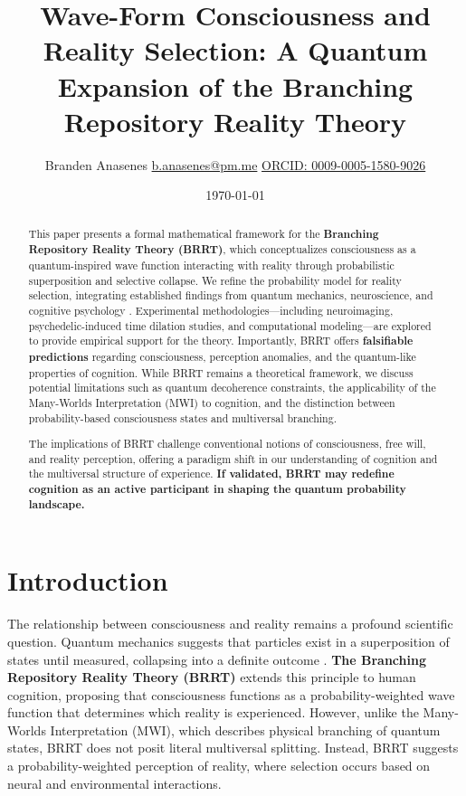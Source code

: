 \documentclass{article}
\title{Wave-Form Consciousness and Reality Selection: A Quantum Expansion of the Branching Repository Reality Theory}
\author{Branden Anasenes \href{mailto:b.anasenes@pm.me}{b.anasenes@pm.me} \href{https://orcid.org/0009-0005-1580-9026}{ORCID: 0009-0005-1580-9026}}
\date{\today}
\begin{document}
\maketitle

\begin{abstract}
This paper presents a formal mathematical framework for the \textbf{Branching Repository Reality Theory (BRRT)}, which conceptualizes consciousness as a quantum-inspired wave function interacting with reality through probabilistic superposition and selective collapse. We refine the probability model for reality selection, integrating established findings from quantum mechanics, neuroscience, and cognitive psychology \cite{schrodinger1935present, fisher2015quantum, carhart2012neural}. Experimental methodologies—including neuroimaging, psychedelic-induced time dilation studies, and computational modeling—are explored to provide empirical support for the theory. Importantly, BRRT offers \textbf{falsifiable predictions} regarding consciousness, perception anomalies, and the quantum-like properties of cognition. While BRRT remains a theoretical framework, we discuss potential limitations such as quantum decoherence constraints, the applicability of the Many-Worlds Interpretation (MWI) to cognition, and the distinction between probability-based consciousness states and multiversal branching. 

The implications of BRRT challenge conventional notions of consciousness, free will, and reality perception, offering a paradigm shift in our understanding of cognition and the multiversal structure of experience. \textbf{If validated, BRRT may redefine cognition as an active participant in shaping the quantum probability landscape.}
\end{abstract}

\section{Introduction}
The relationship between consciousness and reality remains a profound scientific question. Quantum mechanics suggests that particles exist in a superposition of states until measured, collapsing into a definite outcome \cite{everett1957relative}. \textbf{The Branching Repository Reality Theory (BRRT)} extends this principle to human cognition, proposing that consciousness functions as a probability-weighted wave function that determines which reality is experienced. However, unlike the Many-Worlds Interpretation (MWI), which describes physical branching of quantum states, BRRT does not posit literal multiversal splitting. Instead, BRRT suggests a probability-weighted perception of reality, where selection occurs based on neural and environmental interactions.
\end{document}
